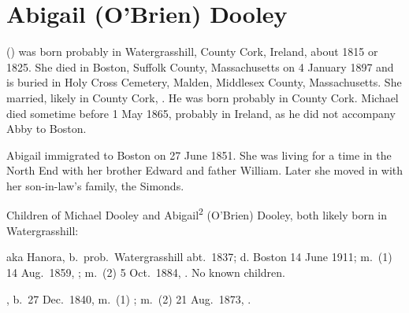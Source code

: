 \section{Abigail (O'Brien) Dooley}

 () was born probably in Watergrasshill, County Cork, Ireland, about 1815\cite{Census1855Abigail} or 1825.\cite{Abigail2OBrienDeath,Chascay} She died in Boston, Suffolk County, Massachusetts on 4 January 1897\cite{Abigail2OBrienDeath} and is buried in Holy Cross Cemetery, Malden, Middlesex County, Massachusetts.\cite{CarolGordon} She married, likely in County Cork, .\cite{Abigail2OBrienDeath} He was born probably in County Cork.\cite{MichaelDooleyBirth} Michael died sometime before 1 May 1865,\cite{Census1865Abigail} probably in Ireland, as he did not accompany Abby to Boston.\cite{Chascay}

Abigail immigrated to Boston on 27 June 1851.\cite{Chascay} She was living for a time in the North End with her brother Edward and father William.\cite{Census1855William} Later she moved in with her son-in-law's family, the Simonds.\cite{Census1860AbigailOBrien}

\begin{KidsIntro}
	Children of Michael Dooley and Abigail\textsuperscript{2} (O'Brien) Dooley, both likely born in Watergrasshill:
\end{KidsIntro}

\begin{Kids}
	 aka Hanora, b.\ prob.\ Watergrasshill abt.\ 1837;\cite{Census1855Hannah3Dooley} d. Boston 14 June 1911;\cite{Hannah3DooleyDeath} m.\ (1) 14 Aug.\ 1859, ;\cite{JeremiahCooneyMarriage} m.\ (2) 5 Oct.\ 1884, .\cite{MichaelCusickMarriage} No known children.
	
	, b.\ 27 Dec.\ 1840, m.\ (1) ; m.\ (2) 21 Aug.\ 1873, .
\end{Kids}
